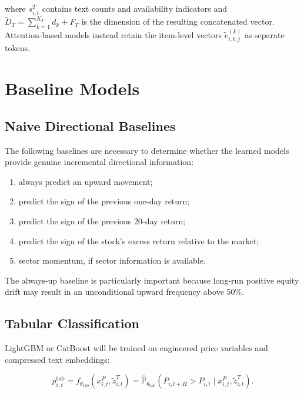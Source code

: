 \documentclass[11pt]{article}
\newcommand{\Prob}{\mathbb{P}}
\begin{document}
where $s^T_{i,t}$ contains text counts and availability indicators and
$\widetilde D_T=\sum_{k=1}^{K_T}d_k+F_T$ is the dimension of the resulting
concatenated vector.  Attention-based models instead retain the item-level
vectors $\widetilde e^{(k)}_{i,t,j}$ as separate tokens.

\section{Baseline Models}

\subsection{Naive Directional Baselines}

The following baselines are necessary to determine whether the learned models
provide genuine incremental directional information:

\begin{enumerate}
    \item always predict an upward movement;
    \item predict the sign of the previous one-day return;
    \item predict the sign of the previous 20-day return;
    \item predict the sign of the stock's excess return relative to the market;
    \item sector momentum, if sector information is available.
\end{enumerate}

The always-up baseline is particularly important because long-run positive
equity drift may result in an unconditional upward frequency above 50\%.

\subsection{Tabular Classification}

LightGBM or CatBoost will be trained on engineered price variables and
compressed text embeddings:

\begin{equation}
p^{\mathrm{tab}}_{i,t}
=
f_{\theta_{\mathrm{tab}}}
\left(
x^P_{i,t},
\widetilde z^T_{i,t}
\right)
=
\widehat{\Prob}_{\theta_{\mathrm{tab}}}
\left(
P_{i,t+H}>P_{i,t}
\mid
x^P_{i,t},\widetilde z^T_{i,t}
\right).
\end{equation}
\end{document}
